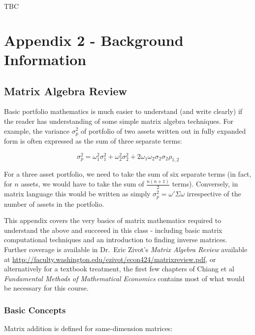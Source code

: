 \documentclass[]{book}
\theoremstyle{definition}
\theoremstyle{definition}
\theoremstyle{definition}
\theoremstyle{remark}
\begin{document}
TBC

\chapter*{Appendix 2 - Background Information}\label{appendix2}

\section*{Matrix Algebra Review}\label{matrix-algebra-review}

Basic portfolio mathematics is much easier to understand (and write
clearly) if the reader has understanding of some simple matrix algebra
techniques. For example, the variance \(\sigma_p^2\) of portfolio of two
assets written out in fully expanded form is often expressed as the sum
of three separate terms:

\begin{equation}
\sigma_p^2 = \omega_1^2 \sigma_1^2 + \omega_2^2 \sigma_2^2 + 2 \omega_1 \omega_2 \sigma_2 \sigma_2 \rho_{1,2}
\end{equation}

For a three asset portfolio, we need to take the sum of six separate
terms (in fact, for \(n\) assets, we would have to take the sum of
\(\frac{n(n+1)}{2}\) terms). Conversely, in matrix language this would
be written as simply \(\sigma_p^2 = \omega' \Sigma \omega\) irrespective
of the number of assets in the portfolio.

This appendix covers the very basics of matrix mathematics required to
understand the above and succeeed in this class - including basic matrix
computational techniques and an introduction to finding inverse
matrices. Further coverage is available in Dr.~Eric Zivot's \emph{Matrix
Algebra Review} available at
\url{http://faculty.washington.edu/ezivot/econ424/matrixreview.pdf}, or
alternatively for a textbook treatment, the first few chapters of Chiang
et al \emph{Fundamental Methods of Mathematical Economics} contains most
of what would be necessary for this course.

\subsection*{Basic Concepts}\label{basic-concepts}

Matrix addition is defined for same-dimension matrices:
\end{document}
